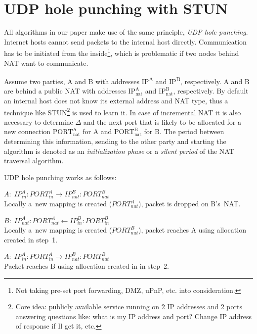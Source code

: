 \documentclass{llncs}
\newcommand{\ignore}[1]{}
\begin{document}
\section{UDP hole punching with STUN}
All algorithms in our paper make use of the same principle, \emph{UDP hole punching}. 
Internet hosts cannot send packets to the internal host directly. 
Communication has to be initiated from the inside\footnote{Not taking
pre-set port forwarding, DMZ, uPnP, etc. into consideration. }, which is problematic if two nodes behind 
NAT want to communicate.

Assume two parties, A and B with addresses IP\textsuperscript{A} and IP\textsuperscript{B}, respectively.
A and B are behind a public NAT with addresses $\text{IP}^{\text{A}}_{\text{nat}}$ and $\text{IP}^{\text{B}}_{\text{nat}}$,
respectively. By default an internal host does not know its external address and NAT type, thus a technique like 
STUN\footnote{Core idea: publicly available service running on 2 IP addresses and 2 ports 
answering questions like: what is my IP address and port? Change IP address of response if Il get it, etc.} 
is used to learn it. In case of incremental NAT it is also necessary to determine $\Delta$ and the next port
that is likely to be allocated for a new connection $\text{PORT}^{\text{A}}_{\text{nat}}$ for A and $\text{PORT}^{\text{B}}_{\text{nat}}$
for B. The period between determining this information, sending to the other party and starting the algorithm is
denoted as an \emph{initialization phase} or a \emph{silent period}\ignore{\footnote{Since the algorithm itself does nothing.}} of the NAT traversal algorithm.

UDP hole punching works as follows:\\
\begin{compactitem}
 \item [1.] $A: \; IP^A_{in}:PORT^A_{in} \longrightarrow IP^B_{nat}:PORT^B_{nat}$ \\
Locally a~new mapping is created ($PORT^A_{nat}$), packet is dropped on B's~NAT.
 \item [2.] $B: \; IP^A_{nat}:PORT^A_{nat} \longleftarrow  IP^B_{in}:PORT^B_{in}$ \\
Locally a~new mapping is created ($PORT^B_{nat}$), packet reaches A using allocation created in step~1.
 \item [3.] $A: \; IP^A_{in}:PORT^A_{in} \longrightarrow IP^B_{nat}:PORT^B_{nat}$ \\
Packet reaches B using allocation created in in step~2.
\end{compactitem}
\end{document}
